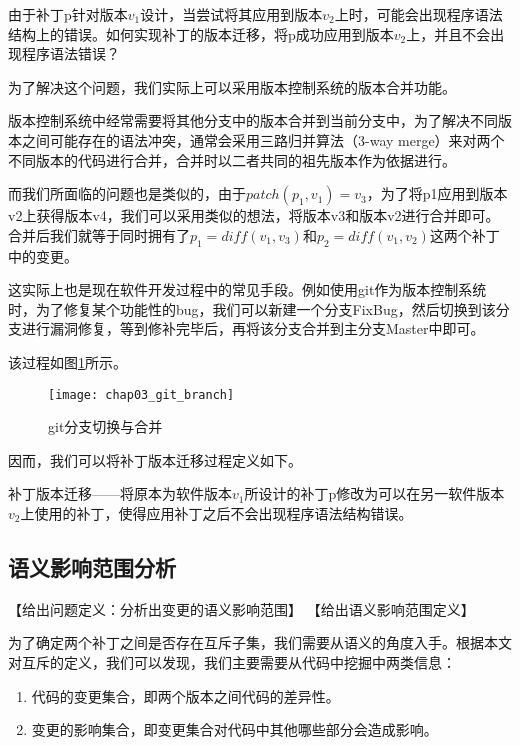\begin{problem}
	\label {patch_reversion}
	由于补丁p针对版本$v_{1}$设计，当尝试将其应用到版本$v_{2}$上时，可能会出现程序语法结构上的错误。如何实现补丁的版本迁移，将p成功应用到版本$v_{2}$上，并且不会出现程序语法错误？
\end{problem}

为了解决这个问题，我们实际上可以采用版本控制系统的版本合并功能。

版本控制系统中经常需要将其他分支中的版本合并到当前分支中，为了解决不同版本之间可能存在的语法冲突，通常会采用三路归并算法（3-way merge）来对两个不同版本的代码进行合并，合并时以二者共同的祖先版本作为依据进行。

而我们所面临的问题也是类似的，由于$patch(p_1,v_1) = v_3$，为了将p1应用到版本v2上获得版本v4，我们可以采用类似的想法，将版本v3和版本v2进行合并即可。合并后我们就等于同时拥有了$p_1 = diff(v_1,v_3)$和$p_2 = diff(v_1,v_2)$这两个补丁中的变更。

这实际上也是现在软件开发过程中的常见手段。例如使用git作为版本控制系统时，为了修复某个功能性的bug，我们可以新建一个分支FixBug，然后切换到该分支进行漏洞修复，等到修补完毕后，再将该分支合并到主分支Master中即可。

该过程如图\ref{git_branch}所示。

\begin{figure}[H]	
	\centering
	\texttt{[image: chap03\_git\_branch]}
	\caption {git分支切换与合并}	
	\label {git_branch}
\end{figure}

因而，我们可以将补丁版本迁移过程定义如下。

\begin{definition}
	补丁版本迁移——将原本为软件版本$v_1$所设计的补丁p修改为可以在另一软件版本$v_2$上使用的补丁，使得应用补丁之后不会出现程序语法结构错误。
\end{definition}

\subsection{语义影响范围分析}

【给出问题定义：分析出变更的语义影响范围】
【给出语义影响范围定义】

为了确定两个补丁之间是否存在互斥子集，我们需要从语义的角度入手。根据本文对互斥的定义，我们可以发现，我们主要需要从代码中挖掘中两类信息：
\begin{enumerate}
	\item 代码的变更集合，即两个版本之间代码的差异性。
	\item 变更的影响集合，即变更集合对代码中其他哪些部分会造成影响。
\end{enumerate}

